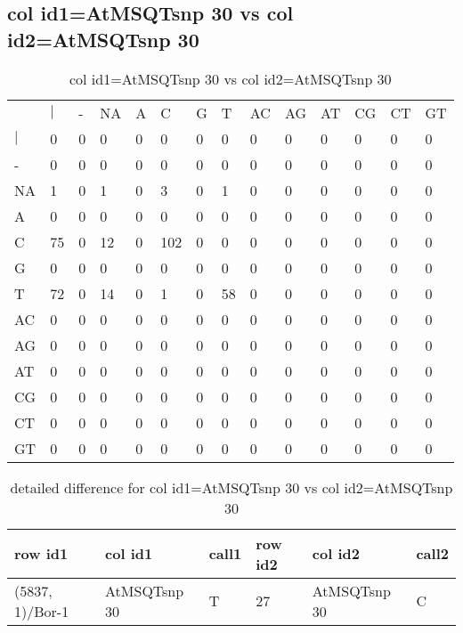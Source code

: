 \subsection{col id1=AtMSQTsnp 30 vs col id2=AtMSQTsnp 30}
\begin{center}
\begin{longtable}{|l|l|l|l|l|l|l|l|l|l|l|l|l|l|}
\caption{col id1=AtMSQTsnp 30 vs col id2=AtMSQTsnp 30} \label{table_dm832}\\
\hline
\\
\hline
&$|$&-&NA&A&C&G&T&AC&AG&AT&CG&CT&GT\\
$|$&0&0&0&0&0&0&0&0&0&0&0&0&0\\
-&0&0&0&0&0&0&0&0&0&0&0&0&0\\
NA&1&0&1&0&3&0&1&0&0&0&0&0&0\\
A&0&0&0&0&0&0&0&0&0&0&0&0&0\\
C&75&0&12&0&102&0&0&0&0&0&0&0&0\\
G&0&0&0&0&0&0&0&0&0&0&0&0&0\\
T&72&0&14&0&1&0&58&0&0&0&0&0&0\\
AC&0&0&0&0&0&0&0&0&0&0&0&0&0\\
AG&0&0&0&0&0&0&0&0&0&0&0&0&0\\
AT&0&0&0&0&0&0&0&0&0&0&0&0&0\\
CG&0&0&0&0&0&0&0&0&0&0&0&0&0\\
CT&0&0&0&0&0&0&0&0&0&0&0&0&0\\
GT&0&0&0&0&0&0&0&0&0&0&0&0&0\\
\hline
\end{longtable}
\end{center}

\begin{center}
\begin{longtable}{|l|l|l|l|l|l|}
\caption{detailed difference for col id1=AtMSQTsnp 30 vs col id2=AtMSQTsnp 30} \label{table_dm833}\\
\hline
row id1&col id1&call1&row id2&col id2&call2\\
\hline
(5837, 1)/Bor-1&AtMSQTsnp 30&T&27&AtMSQTsnp 30&C\\
\hline
\end{longtable}
\end{center}

